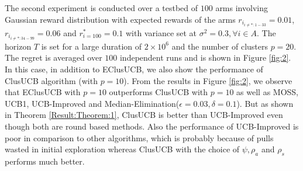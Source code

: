 	The second experiment is conducted over a testbed of $100$ arms involving Gaussian reward distribution with expected rewards of the arms $r_{i_{{i}\neq {*}:1-33}}=0.01$, $r_{i_{{i}\neq {*}:34-99}}=0.06$ and $r^{*}_{i=100}=0.1$ with variance set at $\sigma^{2} = 0.3,\forall i\in A$. The horizon $T$ is set for a large duration of $2\times 10^{6}$ and the number of clusters $p=20$. The regret is averaged over $100$ independent runs and is shown in Figure \ref{fig:2}. In this case, in addition to EClusUCB, we also show the performance of ClusUCB algorithm (with $p=10$). From the results in Figure \ref{fig:2}, we observe that EClusUCB with $p=10$ outperforms ClusUCB with $p=10$ as well as MOSS, UCB1, UCB-Improved and Median-Elimination($\epsilon=0.03,\delta=0.1$). But as shown in Theorem \ref{Result:Theorem:1}, ClusUCB is better than UCB-Improved even though both are round based methods. Also the performance of UCB-Improved is poor in comparison to other algorithms, which is probably because of pulls wasted in initial exploration whereas ClusUCB with the choice of $\psi, \rho_{a}$ and $\rho_{s}$ performs much better.

